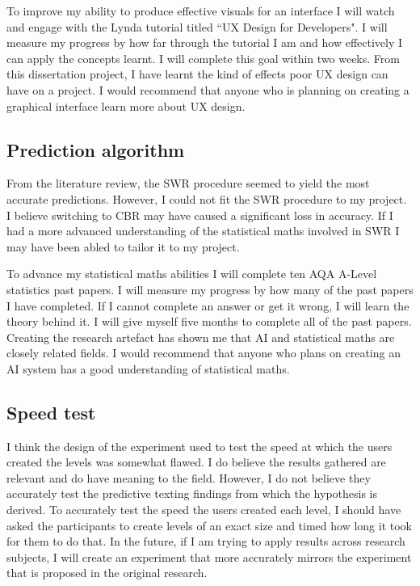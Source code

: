 \documentclass[journal]{IEEEtran}
\begin{document}
To improve my ability to produce effective visuals for an interface I will watch and engage with the Lynda tutorial titled ``UX Design for Developers". I will measure my progress by how far through the tutorial I am and how effectively I can apply the concepts learnt. I will complete this goal within two weeks. From this dissertation project, I have learnt the kind of effects poor UX design can have on a project. I would recommend that anyone who is planning on creating a graphical interface learn more about UX design.  

\subsection{Prediction algorithm}
From the literature review, the SWR procedure seemed to yield the most accurate predictions. However, I could not fit the SWR procedure to my project. I believe switching to CBR may have caused a significant loss in accuracy. If I had a more advanced understanding of the statistical maths involved in SWR I may have been abled to tailor it to my project.

To advance my statistical maths abilities I will complete ten AQA A-Level statistics past papers. I will measure my progress by how many of the past papers I have completed. If I cannot complete an answer or get it wrong, I will learn the theory behind it. I will give myself five months to complete all of the past papers. Creating the research artefact has shown me that AI and statistical maths are closely related fields. I would recommend that anyone who plans on creating an AI system has a good understanding of statistical maths.
 
\subsection{Speed test}
I think the design of the experiment used to test the speed at which the users created the levels was somewhat flawed. I do believe the results gathered are relevant and do have meaning to the field. However,  I do not believe they accurately test the predictive texting findings from which the hypothesis is derived. To accurately test the speed the users created each level, I should have asked the participants to create levels of an exact size and timed how long it took for them to do that. In the future, if I am trying to apply results across research subjects, I will create an experiment that more accurately mirrors the experiment that is proposed in the original research.
\end{document}
